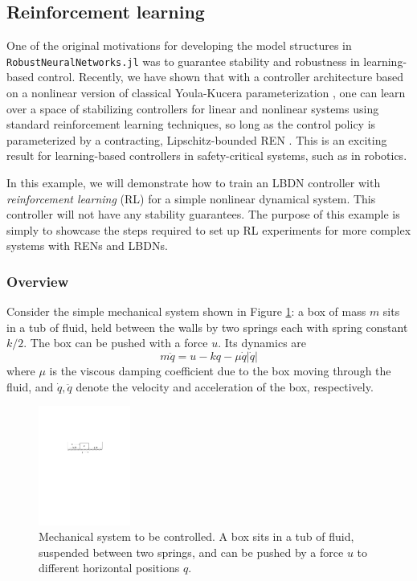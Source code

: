 \subsection{Reinforcement learning} \label{sec:rl}

One of the original motivations for developing the model structures in  \verb|RobustNeuralNetworks.jl| was to guarantee stability and robustness in learning-based control. Recently, we have shown that with a controller architecture based on a nonlinear version of classical Youla-Kucera parameterization \cite{Youla++1976}, one can learn over a space of stabilizing controllers for linear and nonlinear systems using standard reinforcement learning techniques, so long as the control policy is parameterized by a contracting, Lipschitz-bounded REN  \cite{Wang+Manchester2022,Wang++2022,Barbara++2023}. This is an exciting result for learning-based controllers in safety-critical systems, such as in robotics.

In this example, we will demonstrate how to train an LBDN controller with \textit{reinforcement learning} (RL) for a simple nonlinear dynamical system. This controller will not have any stability guarantees. The purpose of this example is simply to showcase the steps required to set up RL experiments for more complex systems with RENs and LBDNs.

\subsubsection{Overview} \label{sec:rl-overview}

Consider the simple mechanical system shown in Figure \ref{fig:rl-box}: a box of mass $m$ sits in a tub of fluid, held between the walls by two springs each with spring constant $k/2.$ The box can be pushed with a force $u.$ Its dynamics are
\begin{equation} \label{eqn:box-dynamics}
m\ddot{q} = u - kq - \mu \dot{q}|\dot{q}|
\end{equation}
where $\mu$ is the viscous damping coefficient due to the box moving through the fluid, and $\dot{q},\ddot{q}$ denote the velocity and acceleration of the box, respectively.

\begin{figure}[!t]
    \centering
    \includegraphics[width=0.27\textwidth]{Images/mass_rl.pdf}
    \caption{Mechanical system to be controlled. A box sits in a tub of fluid, suspended between two springs, and can be pushed by a force $u$ to different horizontal positions $q$.}
    \label{fig:rl-box}
\end{figure}

